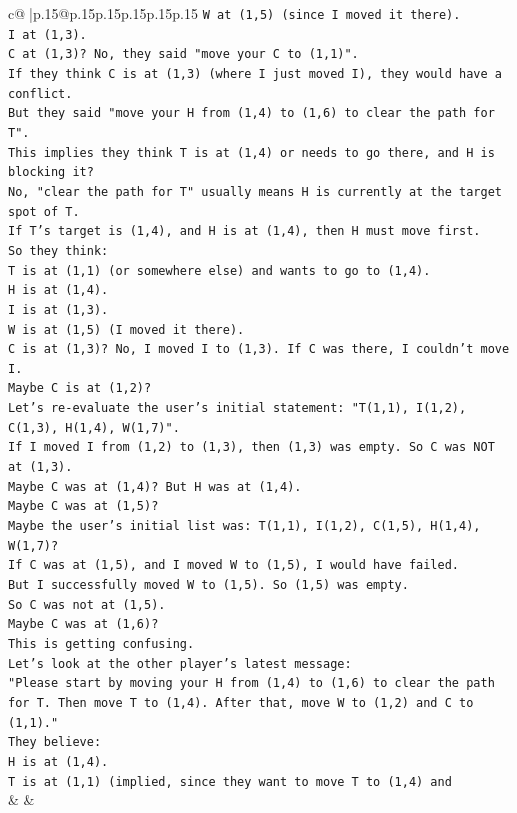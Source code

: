 \documentclass{article}
\begin{document}
{\begin{supertabular}{c@{$\;$}|p{.15\linewidth}@{}p{.15\linewidth}p{.15\linewidth}p{.15\linewidth}p{.15\linewidth}p{.15\linewidth}}
{{{\texttt{W at (1,5) (since I moved it there).} \\
\texttt{I at (1,3).} \\
\texttt{C at (1,3)? No, they said "move your C to (1,1)".} \\
\texttt{If they think C is at (1,3) (where I just moved I), they would have a conflict.} \\
\texttt{But they said "move your H from (1,4) to (1,6) to clear the path for T".} \\
\texttt{This implies they think T is at (1,4) or needs to go there, and H is blocking it?} \\
\texttt{No, "clear the path for T" usually means H is currently at the target spot of T.} \\
\texttt{If T's target is (1,4), and H is at (1,4), then H must move first.} \\
\texttt{So they think:} \\
\texttt{T is at (1,1) (or somewhere else) and wants to go to (1,4).} \\
\texttt{H is at (1,4).} \\
\texttt{I is at (1,3).} \\
\texttt{W is at (1,5) (I moved it there).} \\
\texttt{C is at (1,3)? No, I moved I to (1,3). If C was there, I couldn't move I.} \\
\texttt{Maybe C is at (1,2)?} \\
\texttt{Let's re{-}evaluate the user's initial statement: "T(1,1), I(1,2), C(1,3), H(1,4), W(1,7)".} \\
\texttt{If I moved I from (1,2) to (1,3), then (1,3) was empty. So C was NOT at (1,3).} \\
\texttt{Maybe C was at (1,4)? But H was at (1,4).} \\
\texttt{Maybe C was at (1,5)?} \\
\texttt{Maybe the user's initial list was: T(1,1), I(1,2), C(1,5), H(1,4), W(1,7)?} \\
\texttt{If C was at (1,5), and I moved W to (1,5), I would have failed.} \\
\texttt{But I successfully moved W to (1,5). So (1,5) was empty.} \\
\texttt{So C was not at (1,5).} \\
\texttt{Maybe C was at (1,6)?} \\
\texttt{This is getting confusing.} \\
\texttt{Let's look at the other player's latest message:} \\
\texttt{"Please start by moving your H from (1,4) to (1,6) to clear the path for T. Then move T to (1,4). After that, move W to (1,2) and C to (1,1)."} \\
\texttt{They believe:} \\
\texttt{H is at (1,4).} \\
\texttt{T is at (1,1) (implied, since they want to move T to (1,4) and} \\
            }
        }
    }
    & & \\ \\


\end{supertabular}}
\end{document}
